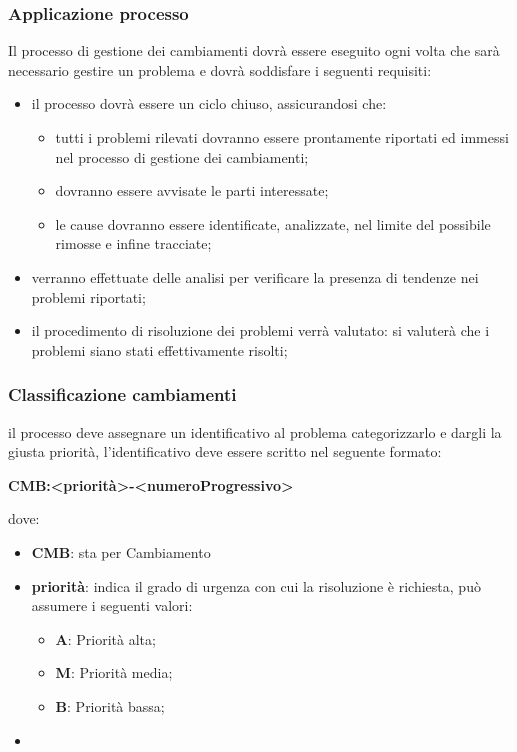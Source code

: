 		\subsubsection{Applicazione processo}
			Il processo di gestione dei cambiamenti dovrà essere eseguito ogni volta che sarà necessario gestire un problema e dovrà soddisfare i seguenti requisiti:
			\begin{itemize}
				\item il processo dovrà essere un ciclo chiuso, assicurandosi che:
					\begin{itemize}
						\item tutti i problemi rilevati dovranno essere prontamente riportati ed immessi nel processo di gestione dei cambiamenti;
						\item dovranno essere avvisate le parti interessate;
						\item le cause dovranno essere identificate, analizzate, nel limite del possibile rimosse e infine tracciate;
					\end{itemize}
				\item  verranno effettuate delle analisi per verificare la presenza di tendenze nei problemi riportati;
				\item  il procedimento di risoluzione dei problemi verrà valutato: si valuterà che i problemi siano stati effettivamente risolti;
			\end{itemize}
		\subsubsection{Classificazione cambiamenti}
			il processo deve assegnare un identificativo al problema categorizzarlo e dargli la giusta priorità, l’identificativo deve essere scritto nel seguente formato:
			\begin{center}
				\textbf{CMB:<priorità>-<numeroProgressivo>}
			\end{center}
			dove:
			\begin{itemize}
				\item\textbf{CMB}: sta per Cambiamento
				\item\textbf{priorità}: indica il grado di urgenza con cui la risoluzione è richiesta, può assumere i seguenti valori:
					\begin{itemize}
						\item\textbf{A}: Priorità alta;
						\item\textbf{M}: Priorità media;
						\item\textbf{B}: Priorità bassa;
					\end{itemize}
				\item\textbf{}
			\end{itemize}
